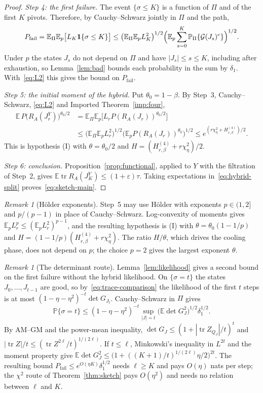 \documentclass[11pt]{article}
\theoremstyle{definition}\newtheorem{definition}[theorem]{Definition}
\theoremstyle{remark}\newtheorem{remark}[theorem]{Remark}
\newcommand{\E}{\mathbb E}
\newcommand{\Prob}{\mathbb P}
\newcommand{\eps}{\varepsilon}
\newcommand{\tr}{\operatorname{tr}}
\newcommand{\calG}{\mathcal G}
\newcommand{\1}{\mathbf 1}
\newcommand{\Pfail}{P_{\mathrm{fail}}}
\begin{document}
\begin{proof}
\emph{Step 4: the first failure.} The event $\{\sigma\le K\}$ is a
function of $\Pi$ and of the first $K$ pivots. Therefore, by
Cauchy--Schwarz jointly in $\Pi$ and the path,
\[
 \Pfail=\E_\Pi\E_p\bigl[L_K\1\{\sigma\le K\}\bigr]
 \le\bigl(\E_\Pi\E_pL_K^2\bigr)^{1/2}
 \Bigl(\E_p\sum_{s=0}^K\Prob_\Pi\{\calG(J_s)^c\}\Bigr)^{1/2}.
\]
Under $p$ the states $J_s$ do not depend on $\Pi$ and have
$|J_s|\le s\le K$, including after exhaustion, so Lemma~\ref{lem:bad} bounds each probability in the
sum by $\delta_1$. With~\eqref{eq:L2} this gives the bound on $\Pfail$.

\emph{Step 5: the initial moment of the hybrid.} Put $\theta_0=1-\beta$.
By Step~3, Cauchy--Schwarz, \eqref{eq:L2} and Imported
Theorem~\ref{imp:four},
\begin{align*}
 \E\,P\bigl(R_A(J^Y_r)\bigr)^{\theta_0/2}
 &=\E_\Pi\E_p\bigl[L_rP(R_A(J_r))^{\theta_0/2}\bigr]\\
 &\le\bigl(\E_\Pi\E_pL_r^2\bigr)^{1/2}\bigl(\E_pP(R_A(J_r))^{\theta_0}\bigr)^{1/2}
 \le e^{(r\chi^2_\eta+H^{(4)}_{r,\beta})/2}.
\end{align*}
This is hypothesis (I) with $\theta=\theta_0/2$ and
$H=(H^{(4)}_{r,\beta}+r\chi^2_\eta)/2$.

\emph{Step 6: conclusion.} Proposition~\ref{prop:functional}, applied to
$Y$ with the filtration of Step~2, gives
$\E\tr R_A(J^Y_K)\le(1+\eps)\tau$. Taking expectations
in~\eqref{eq:hybrid-split} proves~\eqref{eq:sketch-main}.
\end{proof}

\begin{remark}[H\"older exponents]\label{rem:holder}
Step~5 may use H\"older with exponents $p\in(1,2]$ and $p/(p-1)$ in
place of Cauchy--Schwarz. Log-convexity of moments gives
$\E_pL_r^p\le(\E_pL_r^2)^{p-1}$, and the resulting hypothesis is (I)
with $\theta=\theta_0(1-1/p)$ and $H=(1-1/p)(H^{(4)}_{r,\beta}+r\chi^2_\eta)$.
The ratio $H/\theta$, which drives the cooling phase, does not depend on
$p$; the choice $p=2$ gives the largest exponent $\theta$.
\end{remark}

\begin{remark}[The determinant route]\label{rem:det-route}
Lemma~\ref{lem:likelihood} gives a second bound on the first failure
without the hybrid likelihood. On $\{\sigma=t\}$ the states
$J_0,\dots,J_{t-1}$ are good, so by~\eqref{eq:trace-comparison} the
likelihood of the first $t$ steps is at most
$(1-\eta-\eta^2)^{-t}\det G_{J_t}$. Cauchy--Schwarz in $\Pi$ gives
\[
 \Prob\{\sigma=t\}\le(1-\eta-\eta^2)^{-t}
 \sup_{|J|=t}\bigl(\E\det G_J^2\bigr)^{1/2}\delta_1^{1/2}.
\]
By AM--GM and the power-mean inequality,
$\det G_J\le(1+|\tr Z_{Q_J}|/t)^t$ and
$|\tr Z|/t\le(\tr Z^{2\ell}/t)^{1/(2\ell)}$. If $t\le\ell$, Minkowski's
inequality in $L^{2t}$ and the moment property give
$\E\det G_J^2\le\bigl(1+((K+1)/t)^{1/(2\ell)}\eta/2\bigr)^{2t}$. The
resulting bound $\Pfail\le e^{O(\eta K)}\delta_1^{1/2}$ needs
$\ell\ge K$ and pays $O(\eta)$ nats per step; the $\chi^2$ route of
Theorem~\ref{thm:sketch} pays $O(\eta^2)$ and needs no relation between
$\ell$ and $K$.
\end{remark}
\end{document}
